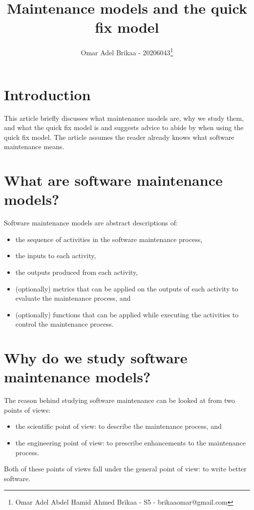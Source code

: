 \documentclass[11pt,a4paper]{article}
\begin{document}
\title{Maintenance models and the quick fix model}
\author{Omar Adel Brikaa - 20206043\thanks{Omar Adel Abdel Hamid Ahmed Brikaa - S5 - brikaaomar@gmail.com}}
\date{}
\maketitle

\tableofcontents

\section{Introduction}
This article briefly discusses what maintenance models are, why we study them,
and what the quick fix model is and suggests advice to abide by when using the quick fix model.
The article assumes the reader already knows what software maintenance means.

\section{What are software maintenance models?}
Software maintenance models are abstract descriptions of:
\begin{itemize}
    \item the sequence of activities in the software maintenance process,
    \item the inputs to each activity,
    \item the outputs produced from each activity,
    \item (optionally) metrics that can be applied on the outputs of each activity to evaluate the maintenance process,
        and
    \item (optionally) functions that can be applied while executing the activities to control the maintenance process.
\end{itemize}

\section{Why do we study software maintenance models?}
The reason behind studying software maintenance can be looked at from two points of views:
\begin{itemize}
    \item the scientific point of view: to describe the maintenance process, and
    \item the engineering point of view: to prescribe enhancements to the maintenance process.
\end{itemize}
Both of these points of views fall under the general point of view: to write better software.
\end{document}
